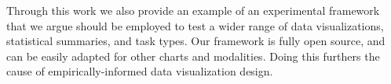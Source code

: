 \documentclass[manuscript, review, anonymous, screen]{acmart}
\begin{document}
Through this work we also provide an example of an experimental
framework that we argue should be employed to test a wider range of data
visualizations, statistical summaries, and task types. Our framework is
fully open source, and can be easily adapted for other charts and
modalities. Doing this furthers the cause of empirically-informed data
visualization design.




\end{document}
